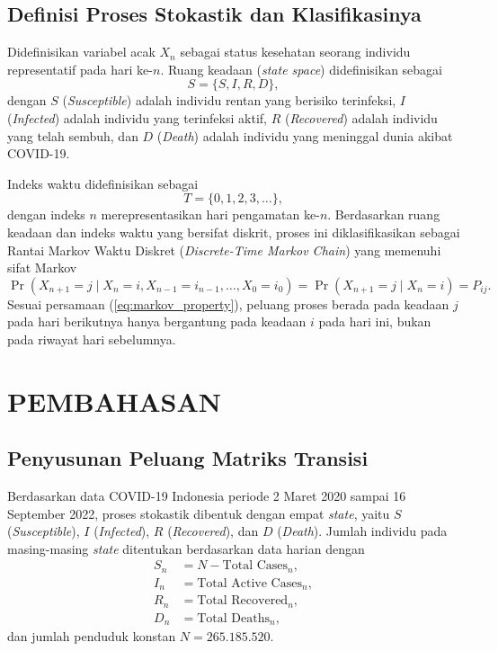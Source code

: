 \documentclass[12pt,a4paper]{article}
\numberwithin{equation}{section}
\begin{document}
\subsection{Definisi Proses Stokastik dan Klasifikasinya}
Didefinisikan variabel acak $X_n$ sebagai status kesehatan seorang individu representatif pada hari ke-$n$. Ruang keadaan (\textit{state space}) didefinisikan sebagai
\[
  S = \{S, I, R, D\},
\]
dengan $S$ (\textit{Susceptible}) adalah individu rentan yang berisiko terinfeksi, $I$ (\textit{Infected}) adalah individu yang terinfeksi aktif, $R$ (\textit{Recovered}) adalah individu yang telah sembuh, dan $D$ (\textit{Death}) adalah individu yang meninggal dunia akibat COVID-19.

Indeks waktu didefinisikan sebagai
\[
  T = \{0, 1, 2, 3, \dots\},
\]
dengan indeks $n$ merepresentasikan hari pengamatan ke-$n$. Berdasarkan ruang keadaan dan indeks waktu yang bersifat diskrit, proses ini diklasifikasikan sebagai Rantai Markov Waktu Diskret (\textit{Discrete-Time Markov Chain}) yang memenuhi sifat Markov
\begin{equation}
  \Pr(X_{n+1} = j \mid X_n = i, X_{n-1} = i_{n-1}, \dots, X_0 = i_0) = \Pr(X_{n+1} = j \mid X_n = i) = P_{ij}.
  \label{eq:markov_property}
\end{equation}
Sesuai persamaan (\ref{eq:markov_property}), peluang proses berada pada keadaan $j$ pada hari berikutnya hanya bergantung pada keadaan $i$ pada hari ini, bukan pada riwayat hari sebelumnya.

\section{PEMBAHASAN}
\thispagestyle{plain}

\subsection{Penyusunan Peluang Matriks Transisi}
Berdasarkan data COVID-19 Indonesia periode 2 Maret 2020 sampai 16 September 2022, proses stokastik dibentuk dengan empat \textit{state}, yaitu $S$ (\textit{Susceptible}), $I$ (\textit{Infected}), $R$ (\textit{Recovered}), dan $D$ (\textit{Death}). Jumlah individu pada masing-masing \textit{state} ditentukan berdasarkan data harian dengan
\begin{align*}
  S_n &= N - \text{Total Cases}_n, \\
  I_n &= \text{Total Active Cases}_n, \\
  R_n &= \text{Total Recovered}_n, \\
  D_n &= \text{Total Deaths}_n,
\end{align*}
dan jumlah penduduk konstan $N = 265.185.520$.
\end{document}
